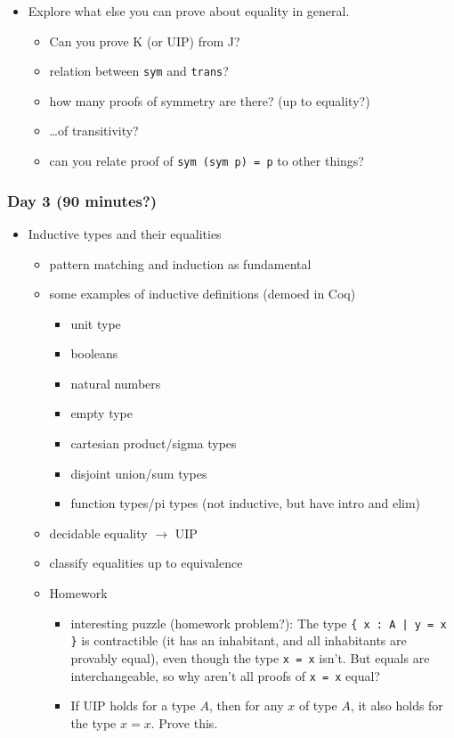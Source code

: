 \documentclass{article}
\begin{document}
\begin{itemize}
\begin{itemize}
\begin{itemize}
        \item Explore what else you can prove about equality in general.
        \begin{itemize}
          \item Can you prove K (or UIP) from J?
          \item relation between \texttt{sym} and \texttt{trans}?
          \item how many proofs of symmetry are there? (up to equality?)
          \item \ldots\space of transitivity?
          \item can you relate proof of \texttt{sym (sym p) = p} to other things?
        \end{itemize}
      \end{itemize}
    \end{itemize}
\end{itemize}

\subsubsection*{Day 3 (90 minutes?)}
\begin{itemize}
  \item Inductive types and their equalities
    \begin{itemize}
      \item pattern matching and induction as fundamental
      \item some examples of inductive definitions (demoed in Coq)
      \begin{itemize}
        \item unit type
        \item booleans
        \item natural numbers
        \item empty type
        \item cartesian product/sigma types
        \item disjoint union/sum types
        \item function types/pi types (not inductive, but have intro and elim)
      \end{itemize}
      \item decidable equality $\to$ UIP
      \item classify equalities up to equivalence
      \item Homework
        \begin{itemize}
          \item
            interesting puzzle (homework problem?): The type \texttt{\{ x : A | y = x \}} is contractible (it has an inhabitant, and all inhabitants are provably equal), even though the type \texttt{x = x} isn't.  But equals are interchangeable, so why aren't all proofs of \texttt{x = x} equal?
          \item
            If UIP holds for a type $A$, then for any $x$ of type $A$, it also holds for the type $x = x$.  Prove this.
        \end{itemize}
      \end{itemize}
\end{itemize}
\end{document}
